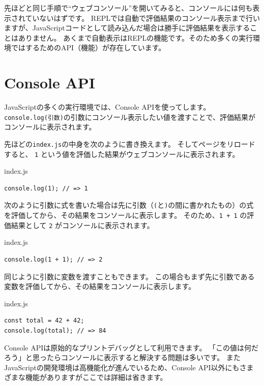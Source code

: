 先ほどと同じ手順で``ウェブコンソール''を開いてみると、コンソールには何も表示されていないはずです。
REPLでは自動で評価結果のコンソール表示まで行いますが、JavaScriptコードとして読み込んだ場合は勝手に評価結果を表示することはありません。
あくまで自動表示はREPLの機能です。そのため多くの実行環境では\textbf{}するためのAPI（機能）が存在しています。

\hypertarget{console-api}{%
\section{Console API}\label{console-api}}

JavaScriptの多くの実行環境では、Console
APIを使って\textbf{}します。
\texttt{console.log(引数)}の引数にコンソール表示したい値を渡すことで、評価結果がコンソールに表示されます。

先ほどの\texttt{index.js}の中身を次のように書き換えます。
そしてページをリロードすると、 \texttt{1}
という値を評価した結果がウェブコンソールに表示されます。

\begin{listtitle}
index.js
\end{listtitle}
\begin{lstlisting}
console.log(1); // => 1
\end{lstlisting}
\listend

次のように引数に式を書いた場合は先に引数（\texttt{(}と\texttt{)}の間に書かれたもの）の式を評価してから、その結果をコンソールに表示します。
そのため、\texttt{1 + 1} の評価結果として
\texttt{2} がコンソールに表示されます。

\begin{listtitle}
index.js
\end{listtitle}
\begin{lstlisting}
console.log(1 + 1); // => 2
\end{lstlisting}
\listend

同じように引数に変数を渡すこともできます。
この場合もまず先に引数である変数を評価してから、その結果をコンソールに表示します。

\begin{listtitle}
index.js
\end{listtitle}
\begin{lstlisting}
const total = 42 + 42;
console.log(total); // => 84
\end{lstlisting}
\listend

Console APIは原始的なプリントデバッグとして利用できます。
「この値は何だろう」と思ったらコンソールに表示すると解決する問題は多いです。
またJavaScriptの開発環境は高機能化が進んでいるため、Console
API以外にもさまざまな機能がありますがここでは詳細は省きます。

